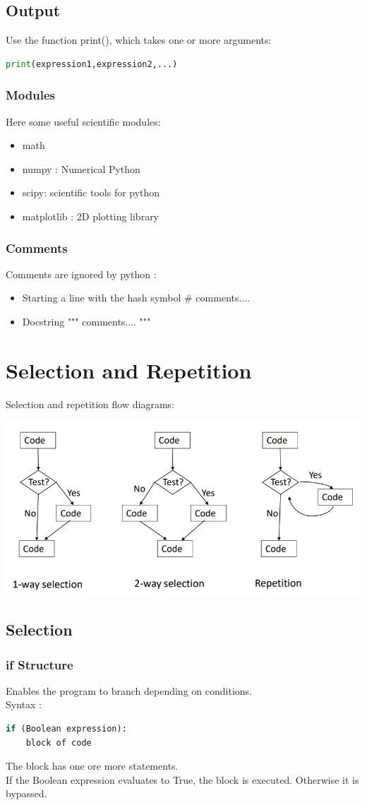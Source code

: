 \documentclass[12pt,oneside]{book}
\begin{document}
\section{Output}
Use the function print(), which takes one or more arguments:
\begin{lstlisting}[language=python]
print(expression1,expression2,...)
\end{lstlisting}
\subsection{Modules}
Here some useful scientific modules:
\begin{itemize}
	\item math
	\item numpy : Numerical Python
	\item scipy: scientific tools for python
	\item matplotlib : 2D plotting library
\end{itemize}
\subsection{Comments}
Comments are ignored by python :
\begin{itemize}
	\item Starting a line with the hash symbol \# comments....
	\item Docstring """ comments.... """
\end{itemize}

\chapter{Selection and Repetition}
Selection and repetition flow diagrams:
\begin{center}
	\includegraphics[width=0.5\linewidth]{../pic/python/25.png}
\end{center}
\section{Selection}
\subsection{if Structure}
Enables the program to branch depending on conditions.\\
Syntax :
\begin{lstlisting}[language=python]
if (Boolean expression):
    block of code 
\end{lstlisting}
The block has one ore more statements.\\
If the Boolean expression evaluates to True, the block is executed. Otherwise it is bypassed.
\end{document}
